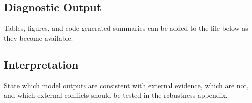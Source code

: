 

\subsection{Diagnostic Output}

Tables, figures, and code-generated summaries can be added to the file below as they
become available.



\subsection{Interpretation}

State which model outputs are consistent with external evidence, which are not, and which
external conflicts should be tested in the robustness appendix.


